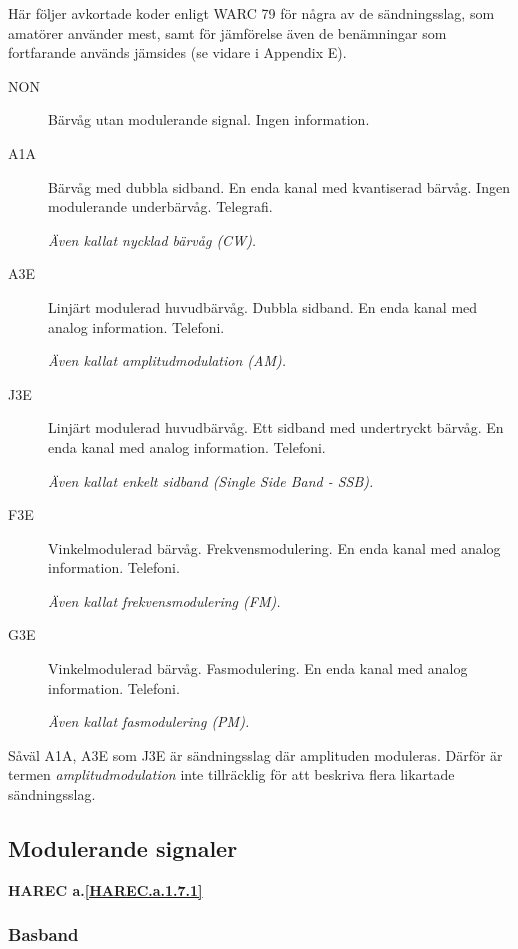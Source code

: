 Här följer avkortade koder enligt WARC 79 för några av de sändningsslag, som
amatörer använder mest, samt för jämförelse även de benämningar som fortfarande
används jämsides (se vidare i Appendix E).

\begin{description}
\item[NON] Bärvåg utan modulerande signal. Ingen information.

\item[A1A] Bärvåg med dubbla sidband. En enda kanal med kvantiserad bärvåg.
Ingen modulerande underbärvåg. Telegrafi.

\emph{Även kallat nycklad bärvåg (CW).}

\item[A3E] Linjärt modulerad huvudbärvåg. Dubbla sidband. En enda kanal med
analog information. Telefoni.

\emph{Även kallat amplitudmodulation (AM).}

\item[J3E] Linjärt modulerad huvudbärvåg. Ett sidband med undertryckt bärvåg.
En enda kanal med analog information. Telefoni.

\emph{Även kallat enkelt sidband (Single Side Band - SSB).}

\item[F3E] Vinkelmodulerad bärvåg. Frekvensmodulering. En enda kanal med analog
information. Telefoni.

\emph{Även kallat frekvensmodulering (FM).}

\item[G3E] Vinkelmodulerad bärvåg. Fasmodulering. En enda kanal med analog
information. Telefoni.

\emph{Även kallat fasmodulering (PM).}
\end{description}

Såväl A1A, A3E som J3E är sändningsslag där amplituden moduleras. Därför är
termen \emph{amplitudmodulation} inte tillräcklig för att beskriva flera
likartade sändningsslag.

\subsection{Modulerande signaler}
\textbf{HAREC a.\ref{HAREC.a.1.7.1}\label{myHAREC.a.1.7.1}}

\subsubsection{Basband}

